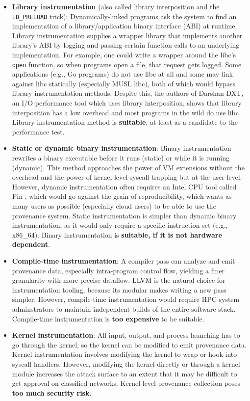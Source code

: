 \begin{itemize}
\item \textbf{Library instrumentation} (also called library interposition and the \texttt{LD\_PRELOAD} trick):
Dynamically-linked programs ask the system to find an implementation of a library/application binary interface (ABI) at runtime.
Library instrumentation supplies a wrapper library that implements another library's ABI by logging and passing certain function calls to an underlying implementation.
For example, one could write a wrapper around the libc's \texttt{open} function, so when programs open a file, that request gets logged.
Some applications (e.g., Go programs) do not use libc at all and some may link against libc statically (especially MUSL libc), both of which would bypass library instrumentation methods.
Despite this, the authors of Darshan DXT, an I/O performance tool which uses library interposition, shows that library interposition has a low overhead and most programs in the wild do use libc \cite{xu_dxt_2017}.
Library instrumentation method is \textbf{suitable}, at least as a candidate to the performance test.

\item \textbf{Static or dynamic binary instrumentation}:
Binary instrumentation rewrites a binary executable before it runs (static) or while it is running (dynamic).
This method approaches the power of VM extensions without the overhead and the power of kernel-level syscall trapping but at the user-level.
However, dynamic instrumentation often requires an Intel CPU tool called Pin \cite{luk_pin_2005}, which would go against the grain of reproducibility, which wants as many users as possible (especially cloud users) to be able to use the provenance system.
Static instrumentation is simpler than dynamic binary instrumentation, as it would only require a specific instruction-set (e.g., x86\_64).
Binary instrumentation is \textbf{suitable, if it is not hardware dependent}.

\item \textbf{Compile-time instrumentation}:
A compiler pass can analyze and emit provenance data, especially intra-program control flow, yielding a finer granularity with more precise dataflow.
LLVM is the natural choice for instrumentation tooling, because its modular makes writing a new pass simpler.
However, compile-time instrumentation would require HPC system adminstrators to maintain independent builds of the entire software stack.
Compile-time instrumentation is \textbf{too expensive} to be suitable.

\item \textbf{Kernel instrumentation}:
All input, output, and process launching has to go through the kernel, so the kernel can be modified to emit provenance data.
Kernel instrumentation involves modifying the kernel to wrap or hook into syscall handlers.
However, modifying the kernel directly or through a kernel module increases the attack surface to an extent that it may be difficult to get approval on classified networks.
Kernel-level provenance collection poses \textbf{too much security risk}.


\end{itemize}
